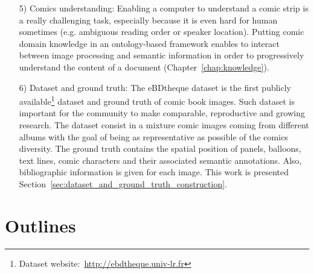 \begin{itemize}
	

	\item [5)] Comics understanding: Enabling a computer to understand a comic strip is a really challenging task, especially because it is even hard for human sometimes (e.g. ambiguous reading order or speaker location).
	Putting comic domain knowledge in an ontology-based framework enables to interact between image processing and semantic information in order to progressively understand the content of a document (Chapter~\ref{chap:knowledge}).

	\item[6)] Dataset and ground truth: The eBDtheque dataset is the first publicly available\footnote{Dataset website:~\url{http://ebdtheque.univ-lr.fr}} dataset and ground truth of comic book images.
	Such dataset is important for the community to make comparable, reproductive and growing research.
	The dataset consist in a mixture comic images coming from different albums with the goal of being as representative as possible of the comics diversity.
	The ground truth contains the spatial position of panels, balloons, text lines, comic characters and their associated semantic annotations.
	Also, bibliographic information is given for each image.
	This work is presented Section~\ref{sec:dataset_and_ground_truth_construction}.


\end{itemize}


\section{Outlines}


